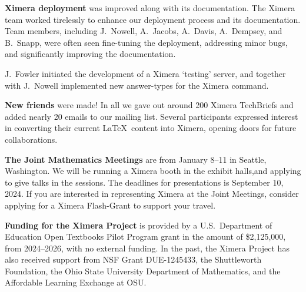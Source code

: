 \documentclass{techbrief}
\begin{document}
\begin{xframe}
    \textbf{Ximera deployment} was improved along with its documentation. The
    Ximera team worked tirelessly to enhance our deployment process and its
    documentation. Team members, including J.\ Nowell, A.\ Jacobs, A.\ Davis,
    A.\ Dempsey, and B.\ Snapp, were often seen fine-tuning the deployment,
    addressing minor bugs, and significantly improving the documentation.

    
    J.\ Fowler initiated the development of a Ximera `testing' server, and together
    with J.\ Nowell implemented new answer-types for the Ximera \texttt{\answer} command.

\end{xframe}

\begin{xframe}
    \textbf{New friends} were made! In all we gave out around 200 Ximera
    TechBriefs and added nearly 20 emails to our mailing list.	Several
    participants expressed interest in converting their current \LaTeX\ content
    into Ximera, opening doors for future collaborations.
\end{xframe}

\begin{xframe}
    {\sffamily\bfseries The Joint Mathematics Meetings} are from January 8--11
    in Seattle, Washington. We will be running a Ximera booth in the exhibit
    halls,and applying to give talks in the sessions. The deadlines for
    presentations is September 10, 2024. If you are interested in representing
    Ximera at the
    Joint Meetings, consider applying for a Ximera Flash-Grant to support your
    travel.
\end{xframe}

\begin{xframe}
    \textbf{Funding for the Ximera Project} is provided by
    a U.S.\ Department of Education Open Textbooks Pilot Program grant in the
    amount of \$2,125,000, from 2024--2026, with no external funding. In the
    past, the Ximera Project has
    also received support from NSF Grant DUE-1245433, the Shuttleworth
    Foundation, the Ohio State University
    Department of Mathematics, and the Affordable Learning Exchange at OSU.
\end{xframe}
\end{document}
